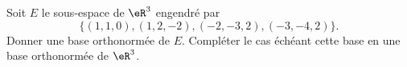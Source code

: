 

\begin{exercice}\label{exoINGE1121La0003}

	Soit $E$ le sous-espace de $\eR^3$ engendré par
	\begin{equation}
		\{  (1,1,0),(1,2,-2),(-2,-3,2),(-3,-4,2)  \}.
	\end{equation}
	Donner une base orthonormée de $E$. Compléter le cas échéant cette base en une base orthonormée de $\eR^3$.

\end{exercice}
